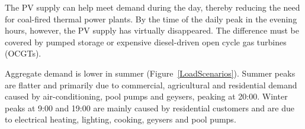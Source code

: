 The PV supply can help meet demand during the day, thereby reducing the need for coal-fired thermal power plants. By the time of the daily peak in the evening hours, however, the PV supply has virtually disappeared. The difference must be covered by pumped storage or expensive diesel-driven open cycle gas turbines (OCGTs).




Aggregate demand is lower in summer (Figure~\ref{LoadScenarios}). Summer peaks are flatter and primarily due to commercial, agricultural and residential demand caused by air-conditioning, pool pumps and geysers, peaking at 20:00. Winter peaks at 9:00 and 19:00 are mainly caused by residential customers and are due to electrical heating, lighting, cooking, geysers and pool pumps.

